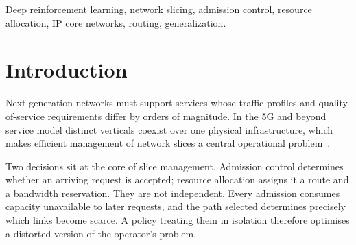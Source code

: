 \documentclass[10pt,journal,comsoc]{IEEEtran}
\begin{document}
\begin{abstract}
$+12.7\%$ at $\rho=14.4\%$. Two real substrates fall on the same
line. $\rho$ requires no training to evaluate, so an operator can decide
the architecture before committing to it. We further identify the
mechanism behind the admission half of the problem: the learned policy
preserves future admissibility, sustaining $54.9\%$ routable arrivals
against $46.2\%$ under a strong bottleneck-aware greedy policy. Against a
controller built on the aggregate resource state used in the 5G-core
literature, the joint agent admits $14.6\%$ more slices, of which
$6.7$ percentage points are attributable to the path-level state
representation alone. Finally, the factored architecture is never
significantly worse than an admission-only controller, including where
routing is provably useless, and significantly better where routing
matters, making it the architecture we recommend.
\end{abstract}
\IEEEpubidadjcol
\begin{IEEEkeywords}
Deep reinforcement learning, network slicing, admission control,
resource allocation, IP core networks, routing, generalization.
\end{IEEEkeywords}

\section{Introduction}
Next-generation networks must support services whose traffic profiles and
quality-of-service requirements differ by orders of magnitude. In the 5G
and beyond service model distinct verticals coexist over one physical
infrastructure, which makes efficient management of network slices a
central operational problem~\cite{guan2021customized,bernardez2021machine}.

Two decisions sit at the core of slice management. Admission control
determines whether an arriving request is accepted; resource allocation
assigns it a route and a bandwidth reservation. They are not independent.
Every admission consumes capacity unavailable to later requests, and the
path selected determines precisely which links become scarce. A policy
treating them in isolation therefore optimises a distorted version of the
operator's problem.
\end{document}
